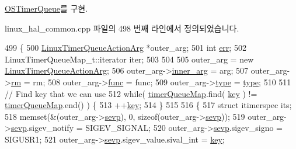 \hyperlink{class_o_s_timer_queue_aedd4a6892651a861ca78a9862065b539}{O\+S\+Timer\+Queue}를 구현.



linux\+\_\+hal\+\_\+common.\+cpp 파일의 498 번째 라인에서 정의되었습니다.


\begin{DoxyCode}
499                                                       \{
500     \hyperlink{struct_linux_timer_queue_action_arg}{LinuxTimerQueueActionArg} *outer\_arg;
501     \textcolor{keywordtype}{int} \hyperlink{gst__avb__playbin_8c_a6ce68847c12434f60d1b2654a3dc3409}{err};
502     LinuxTimerQueueMap\_t::iterator iter;
503 
504 
505     outer\_arg = \textcolor{keyword}{new} \hyperlink{struct_linux_timer_queue_action_arg}{LinuxTimerQueueActionArg};
506     outer\_arg->\hyperlink{struct_linux_timer_queue_action_arg_afc701b8a5b43cd1d29422c68856bc614}{inner\_arg} = arg;
507     outer\_arg->\hyperlink{struct_linux_timer_queue_action_arg_a059a8adfbb578bc50c97a96ae2ac0779}{rm} = rm;
508     outer\_arg->\hyperlink{struct_linux_timer_queue_action_arg_aaa1ebdc5351c8e4b6cd0b92aabfa4d52}{func} = func;
509     outer\_arg->\hyperlink{struct_linux_timer_queue_action_arg_ac765329451135abec74c45e1897abf26}{type} = \hyperlink{namespaceastime__fitline_a7aead736a07eaf25623ad7bfa1f0ee2d}{type};
510 
511     \textcolor{comment}{// Find key that we can use}
512     \textcolor{keywordflow}{while}( \hyperlink{class_linux_timer_queue_a108ec18a8374f47037489ab2d93b73ba}{timerQueueMap}.find( \hyperlink{class_linux_timer_queue_a35af0be900467fedbb610bd6ea65ed78}{key} ) != \hyperlink{class_linux_timer_queue_a108ec18a8374f47037489ab2d93b73ba}{timerQueueMap}.end() ) \{
513         ++\hyperlink{class_linux_timer_queue_a35af0be900467fedbb610bd6ea65ed78}{key};
514     \}
515 
516     \{
517         \textcolor{keyword}{struct }itimerspec its;
518         memset(&(outer\_arg->\hyperlink{struct_linux_timer_queue_action_arg_a9baffc52a0a03ab47948763b47ab6d91}{sevp}), 0, \textcolor{keyword}{sizeof}(outer\_arg->\hyperlink{struct_linux_timer_queue_action_arg_a9baffc52a0a03ab47948763b47ab6d91}{sevp}));
519         outer\_arg->\hyperlink{struct_linux_timer_queue_action_arg_a9baffc52a0a03ab47948763b47ab6d91}{sevp}.sigev\_notify = SIGEV\_SIGNAL;
520         outer\_arg->\hyperlink{struct_linux_timer_queue_action_arg_a9baffc52a0a03ab47948763b47ab6d91}{sevp}.sigev\_signo  = SIGUSR1;
521         outer\_arg->\hyperlink{struct_linux_timer_queue_action_arg_a9baffc52a0a03ab47948763b47ab6d91}{sevp}.sigev\_value.sival\_int = \hyperlink{class_linux_timer_queue_a35af0be900467fedbb610bd6ea65ed78}{key};

\end{DoxyCode}
